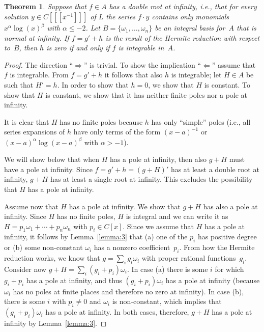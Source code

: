 \documentclass{sig-alternate}
\newtheorem{theorem}{Theorem}
\begin{document}
\begin{theorem}\label{thm:intiff0}
  Suppose that $f\in A$ has a double root at infinity,
  i.e., that for every solution $y\in C[[[x^{-1}]]]$ of $L$
  the series $f\cdot y$ contains only monomials $x^\alpha\log(x)^\beta$ with $\alpha\leq-2$.
  Let $B=\{\omega_1,\ldots,\omega_n\}$ be an integral basis for~$A$
that is normal at infinity.
If $f=g'+h$ is the result of the Hermite reduction with respect to~$B$,
then $h$ is zero if and only if $f$ is integrable in~$A$.
\end{theorem}
\begin{proof}
The direction ``$\Rightarrow$'' is trivial. To show the implication
``$\Leftarrow$'' assume that $f$ is integrable. From $f=g'+h$ it follows that
also $h$ is integrable; let $H\in A$ be such that $H'=h$.  In order to show
that $h=0$, we show that $H$ is constant.  To show that $H$ is constant, we
show that it has neither finite poles nor a pole at infinity.

It is clear that $H$ has no finite poles because $h$ has only ``simple'' poles
(i.e., all series expansions of $h$ have only terms of the form
$(x-a)^{-1}$ or $(x-a)^\alpha\log(x-a)^\beta$ with $\alpha>-1$).

We will show below that when $H$ has a pole at infinity, then also $g+H$ must
have a pole at infinity.  Since $f=g'+h=(g+H)'$ has at least a double root at
infinity, $g+H$ has at least a single root at infinity. This excludes the
possibility that $H$ has a pole at infinity.

Assume now that $H$ has a pole at infinity. We show that $g+H$ has also a pole at infinity.
Since $H$ has no finite poles, $H$ is integral and we can write it as
$H=p_1\omega_1+\cdots+p_n\omega_n$ with $p_i\in C[x]$.
Since we assume that $H$ has a pole at infinity, it follows by Lemma~\ref{lemma:3} that
(a) one of the $p_i$ has positive degree or
(b) some non-constant $\omega_i$ has a nonzero coefficient~$p_i$.
From how the Hermite reduction works, we know that $g=\sum_i g_i\omega_i$
with proper rational functions~$g_i$. Consider now $g+H=\sum_i (g_i+p_i)\omega_i$.
In case (a) there is some $i$ for which $g_i+p_i$ has a pole at infinity,
and thus $(g_i+p_i)\omega_i$ has a pole at infinity (because $\omega_i$ has
no poles at finite places and therefore no zero at infinity).
In case (b), there is some $i$ with $p_i\neq0$ and $\omega_i$ is non-constant,
which implies that $(g_i+p_i)\omega_i$ has a pole at infinity.
In both cases, therefore, $g+H$ has a pole at infinity by Lemma~\ref{lemma:3}.
\end{proof}
\end{document}
